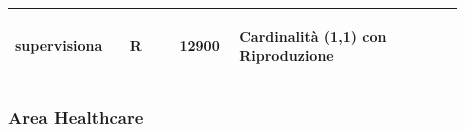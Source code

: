 \documentclass[12pt,a4paper]{article}
\begin{document}
\begin{center}
\begin{longtable}{|p{0.23\linewidth}|p{0.1\linewidth}|p{0.11\linewidth}|p{0.45\linewidth}|}
\hline
supervisiona 				& \begin{center}
\vspace{-25pt}R
\end{center}
					& \begin{center}
					\vspace{-25pt}12900\end{center}
					& \begin{flushleft}\vspace{-25pt} Cardinalità (1,1) con Riproduzione \end{flushleft}\\ 

\hline

\end{longtable}\end{center}


\subsubsection{Area Healthcare}
\end{document}
